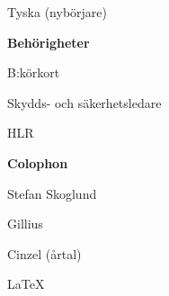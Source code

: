\documentclass[a4paper,swedish,10pt]{article}
\begin{document}
\begin{minipage}[t]{0.27\textwidth}
\begin{description}[nosep,itemsep=0.1ex]
  \item Tyska (nybörjare)
  \end{description}
  \vspace{0.5cm}
  \textbf{Behörigheter}
  \begin{description}[nosep]
    \raggedleft\setlength\itemsep{0.1ex}\small%
  \item B:körkort
  \item Skydds- och säkerhetsledare
  \item HLR
  \end{description}
  \vspace{5cm}
  \textbf{Colophon}
  \begin{description}[nosep]
    \raggedleft\setlength\itemsep{0.1ex}\small%
  \item Stefan Skoglund {}
  \item Gillius
  \item Cinzel (årtal)
  \item \LaTeX%
  \end{description}
\end{minipage}


\end{document}
